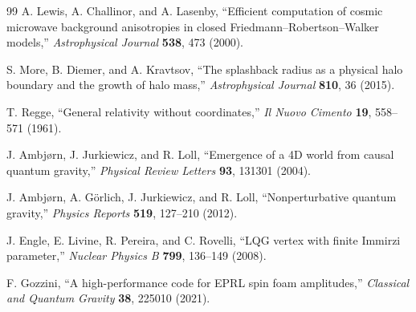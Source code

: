 \documentclass[11pt]{article}
\begin{document}
\begin{thebibliography}{99}
A. Lewis, A. Challinor, and A. Lasenby,
``Efficient computation of cosmic microwave background anisotropies in closed Friedmann--Robertson--Walker models,''
\emph{Astrophysical Journal} \textbf{538}, 473 (2000).

S. More, B. Diemer, and A. Kravtsov,
``The splashback radius as a physical halo boundary and the growth of halo mass,''
\emph{Astrophysical Journal} \textbf{810}, 36 (2015).

T. Regge,
``General relativity without coordinates,''
\emph{Il Nuovo Cimento} \textbf{19}, 558--571 (1961).

J. Ambj{\o}rn, J. Jurkiewicz, and R. Loll,
``Emergence of a 4D world from causal quantum gravity,''
\emph{Physical Review Letters} \textbf{93}, 131301 (2004).

J. Ambj{\o}rn, A. G{\"o}rlich, J. Jurkiewicz, and R. Loll,
``Nonperturbative quantum gravity,''
\emph{Physics Reports} \textbf{519}, 127--210 (2012).

J. Engle, E. Livine, R. Pereira, and C. Rovelli,
``LQG vertex with finite Immirzi parameter,''
\emph{Nuclear Physics B} \textbf{799}, 136--149 (2008).

F. Gozzini,
``A high-performance code for EPRL spin foam amplitudes,''
\emph{Classical and Quantum Gravity} \textbf{38}, 225010 (2021).

\end{thebibliography}
\end{document}
